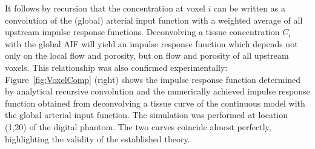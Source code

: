 \documentclass[aps,prb,article,groupedaddress,showkeys]{revtex4}
\begin{document}
	It follows by recursion that the concentration at voxel $i$ can be written as a convolution of the (global) arterial input function with a weighted average of all upstream impulse response functions.
	Deconvolving a tissue concentration $C_i$ with the global AIF will yield an impulse response function which depends not only on the local flow and porosity, but on flow and porosity of all upstream voxels.
	This relationship was also confirmed experimentally: Figure~\ref{fig:VoxelComp} (right) shows the impulse response function determined by analytical recursive convolution and the numerically achieved impulse response function obtained from deconvolving a tissue curve of the continuous model with the global arterial input function. 
	The simulation was performed at location (1,20) of the digital phantom.
	The two curves coincide almost perfectly, highlighting the validity of the established theory.
\end{document}

